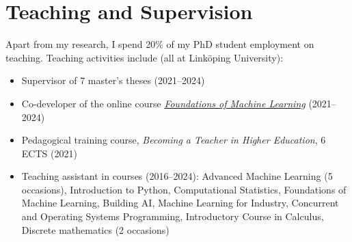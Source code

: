 \section*{Teaching and Supervision}
Apart from my research, I spend 20\% of my PhD student employment on teaching. Teaching activities include (all at Linköping University):
\begin{itemize}
    \item Supervisor of 7 master's theses (2021--2024)
    \item Co-developer of the online course \href{https://foundations-of-ml.ida.liu.se/}{\textit{Foundations of Machine Learning}} (2021--2024)
    \item Pedagogical training course, \textit{Becoming a Teacher in Higher Education}, 6 ECTS (2021)
    \item Teaching assistant in courses (2016--2024):
        Advanced Machine Learning (5 occasions),
        Introduction to Python,
        Computational Statistics,
        Foundations of Machine Learning,
        Building AI,
        Machine Learning for Industry,
        Concurrent and Operating Systems Programming,
        Introductory Course in Calculus,
        Discrete mathematics (2 occasions)
\end{itemize}
